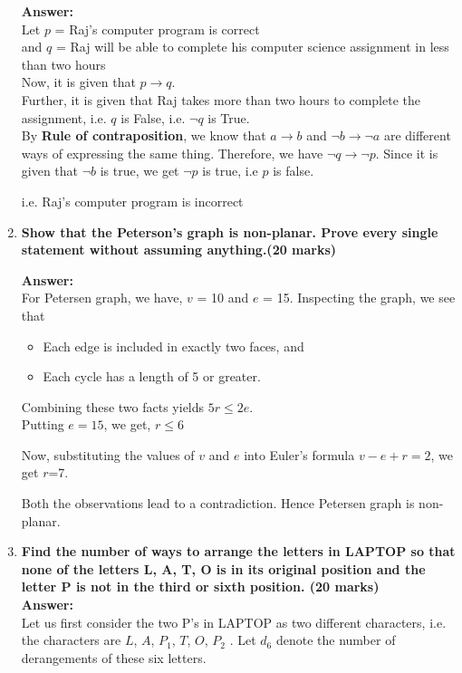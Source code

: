 \documentclass[a4paper]{article}
\begin{document}
\begin{enumerate}
    \textbf{Answer:}\\
    Let $p$ = Raj's computer program is correct\\
    and $q$ = Raj will be able to complete his computer science assignment in less than two hours\\
     
    Now, it is given that $p \rightarrow q$.\\
    Further, it is given that Raj takes more than two hours to complete the assignment, i.e. $q$ is False, i.e. $\neg q$ is True. \\
   
    By \textbf{Rule of contraposition}, we know that $a \rightarrow b$ and $\neg b \rightarrow \neg a$ are different ways of expressing the same thing. Therefore, we have $\neg q \rightarrow \neg p$. Since it is given that $\neg b$ is true, we get $\neg p$ is true, i.e $p$ is false.
    
    i.e. Raj's computer program is incorrect
    
    \item \textbf{Show that the Peterson's graph is non-planar. Prove every single statement without assuming anything.(20 marks)\\}

    \textbf{Answer:}\\
     For Petersen graph, we have, $v$ = 10 and $e$ = 15. Inspecting the graph, we see that 

\begin{itemize}
\item Each edge is included in exactly two faces, and 
\item Each cycle has a length of 5 or greater. 
\end{itemize}
Combining these two facts yields $5r\le2e$.\\
Putting $e=15$, we get, $r\le6$

Now, substituting the values of $v$ and $e$ into Euler's formula $v-e+r=2$, we get $r$=7. 

Both the observations lead to a contradiction. Hence Petersen graph is non-planar.

    \item \textbf{Find the number of ways to arrange the letters in LAPTOP so that none of the letters L, A, T, O is in its original position and the letter P is not in the third or sixth position. (20 marks)}\\
  
    \textbf{Answer:}\\
    Let us first consider the two P's in LAPTOP as two different characters, i.e. the characters are $L$, $A$, $P_1$, $T$, $O$, $P_2$ . Let $d_6$ denote the number of derangements of these six letters.


\end{enumerate}
\end{document}
